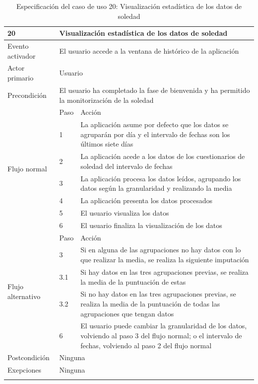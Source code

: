     \begin{table}[h]
        \centering
        \begin{tabularx}{\textwidth}{|l|l|X|}
            \hline
            20 & \multicolumn{2}{|X|}{Visualización estadística de los datos de soledad} \\
            \hline
            Evento activador & \multicolumn{2}{|X|}{El usuario accede a la ventana de histórico de la aplicación} \\
            \hline
            Actor primario & \multicolumn{2}{|X|}{Usuario} \\
            \hline
            Precondición & \multicolumn{2}{|X|}{El usuario ha completado la fase de bienvenida y ha permitido la monitorización de la soledad} \\
            \hline
            \multirow{7}{*}{Flujo normal} & Paso & Acción \\
            \cline{2-3} & 1 & La aplicación asume por defecto que los datos se agruparán por día y el intervalo de fechas son los últimos siete días \\
            \cline{2-3} & 2 & La aplicación acede a los datos de los cuestionarios de soledad del intervalo de fechas \\
            \cline{2-3} & 3 & La aplicación procesa los datos leídos, agrupando los datos según la granularidad y realizando la media \\
            \cline{2-3} & 4 & La aplicación presenta los datos procesados \\
            \cline{2-3} & 5 & El usuario visualiza los datos \\
            \cline{2-3} & 6 & El usuario finaliza la visualización de los datos \\
            \hline
            \multirow{5}{*}{Flujo alternativo} & Paso & Acción \\
            \cline{2-3} & 3 & Si en alguna de las agrupaciones no hay datos con lo que realizar la media, se realiza la siguiente imputación \\
            \cline{2-3} & 3.1 & Si hay datos en las tres agrupaciones previas, se realiza la media de la puntuación de estas \\
            \cline{2-3} & 3.2 & Si no hay datos en las tres agrupaciones previas, se realiza la media de la puntuación de todas las agrupaciones que tengan datos \\
            \cline{2-3} & 6 & El usuario puede cambiar la granularidad de los datos, volviendo al paso 3 del flujo normal; o el intervalo de fechas, volviendo al paso 2 del flujo normal \\
            \hline
            Postcondición & \multicolumn{2}{|X|}{Ninguna} \\
            \hline
            Exepciones & \multicolumn{2}{|X|}{Ninguna} \\
            \hline
            \caption{Especificación del caso de uso 20: Visualización estadística de los datos de soledad}
            \label{tabla:casos_uso:visualizacion_estadistica_soledad}
        \end{tabularx}
    \end{table}

